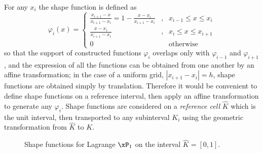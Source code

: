 \medskip
For any $x_i$ the shape function is defined as
\begin{equation*}
\varphi_{i}(x) =
\left\lbrace
\begin{array}{lcl}
\displaystyle\frac{x_{i+1} - x}{x_{i+1} - x_{i}} = 1 - \frac{x - x_{i}}{x_{i+1} - x_{i}}&,& x_{i-1} \leq x \leq x_{i}\\[2ex]
\displaystyle\frac{x - x_{i}}{x_{i+1} - x_{i}}&,& x_{i} \leq x \leq x_{i+1}\\[2ex]
0 &&\mbox{otherwise}
\end{array}
\right.
\end{equation*}
so that the support of constructed functions $\varphi_i$ overlaps only with $\varphi_{i-1}$ and $\varphi_{i+1}$, and the expression of all the functions can be obtained from one another by an affine transformation; in the case of a uniform grid, $|x_{i+1} - x_{i}| = h$, shape functions are obtained simply by translation.
Therefore it would be convenient to define shape functions on a reference interval, then apply an affine transformation to generate any $\varphi_i$.
Shape functions are considered on a \textit{reference cell} $\hat{K}$ which is the unit interval, then transported to any subinterval $K_i$ using the geometric transformation from $\hat{K}$ to $K$.

\begin{figure}[h!]\label{fig:lagrange_P1_1D}
\centering
{}
\caption{Shape functions for Lagrange $\xPone$ on the interval $\hat{K} = [0,1]$.}
\end{figure}

